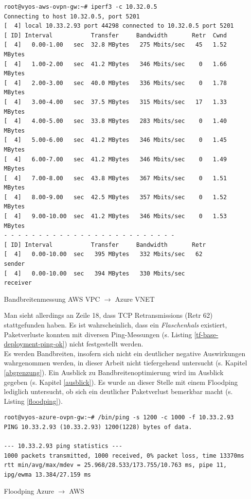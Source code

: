 \begin{listing}[h]
\begin{verbatim}
root@vyos-aws-ovpn-gw:~# iperf3 -c 10.32.0.5
Connecting to host 10.32.0.5, port 5201
[  4] local 10.33.2.93 port 44298 connected to 10.32.0.5 port 5201
[ ID] Interval           Transfer     Bandwidth       Retr  Cwnd
[  4]   0.00-1.00   sec  32.8 MBytes   275 Mbits/sec   45   1.52 MBytes
[  4]   1.00-2.00   sec  41.2 MBytes   346 Mbits/sec    0   1.66 MBytes
[  4]   2.00-3.00   sec  40.0 MBytes   336 Mbits/sec    0   1.78 MBytes
[  4]   3.00-4.00   sec  37.5 MBytes   315 Mbits/sec   17   1.33 MBytes
[  4]   4.00-5.00   sec  33.8 MBytes   283 Mbits/sec    0   1.40 MBytes
[  4]   5.00-6.00   sec  41.2 MBytes   346 Mbits/sec    0   1.45 MBytes
[  4]   6.00-7.00   sec  41.2 MBytes   346 Mbits/sec    0   1.49 MBytes
[  4]   7.00-8.00   sec  43.8 MBytes   367 Mbits/sec    0   1.51 MBytes
[  4]   8.00-9.00   sec  42.5 MBytes   357 Mbits/sec    0   1.52 MBytes
[  4]   9.00-10.00  sec  41.2 MBytes   346 Mbits/sec    0   1.53 MBytes
- - - - - - - - - - - - - - - - - - - - - - - - -
[ ID] Interval           Transfer     Bandwidth       Retr
[  4]   0.00-10.00  sec   395 MBytes   332 Mbits/sec   62             sender
[  4]   0.00-10.00  sec   394 MBytes   330 Mbits/sec                  receiver
\end{verbatim}
\caption{Bandbreitenmessung AWS VPC $\rightarrow$ Azure VNET}
\label{iperf3-vpc-vnet}
\end{listing}\FloatBarrier
Man sieht allerdings an Zeile 18, dass TCP Retransmissions (\glqq Retr 62\grqq{}) stattgefunden haben. Es ist wahrscheinlich, dass ein \textit{Flaschenhals} existiert, Paketverluste konnten mit diversen Ping-Messungen (s. Listing \ref{tf-base-deployment-ping-ok}) nicht festgestellt werden.\\
Es werden Bandbreiten, insofern sich nicht ein deutlicher negative Auswirkungen wahrgenommen werden, in dieser Arbeit nicht tiefergehend untersucht (s. Kapitel \ref{abgrenzung}). Ein Ausblick zu Bandbreitenoptimierung wird im Ausblick gegeben (s. Kapitel \ref{ausblick}). Es wurde an dieser Stelle mit einem Floodping lediglich untersucht, ob sich ein deutlicher Paketverlust bemerkbar macht (s. Listing \ref{floodping}).
\begin{listing}[h]
\begin{verbatim}
root@vyos-azure-ovpn-gw:~# /bin/ping -s 1200 -c 1000 -f 10.33.2.93
PING 10.33.2.93 (10.33.2.93) 1200(1228) bytes of data.

--- 10.33.2.93 ping statistics ---
1000 packets transmitted, 1000 received, 0% packet loss, time 13370ms
rtt min/avg/max/mdev = 25.968/28.533/173.755/10.763 ms, pipe 11, ipg/ewma 13.384/27.159 ms
\end{verbatim}
\caption{Floodping Azure $\rightarrow$ AWS}
\label{floodping}
\end{listing}\FloatBarrier

